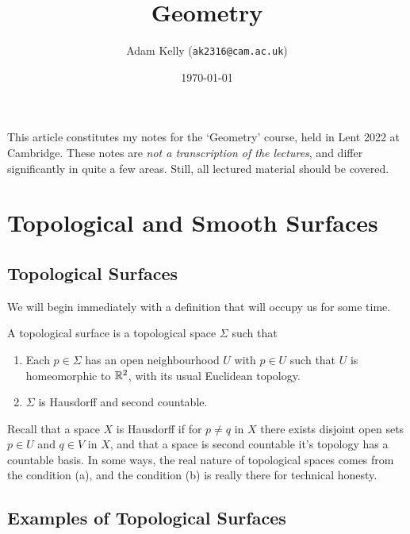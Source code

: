 \documentclass[a4paper]{scrartcl}
\title{Geometry}
\author{Adam Kelly (\texttt{ak2316@cam.ac.uk})}
\date{\today}
\begin{document}
\maketitle 


This article constitutes my notes for the `Geometry' course, held in Lent 2022 at Cambridge. These notes are \emph{not a transcription of the lectures}, and differ significantly in quite a few areas. Still, all lectured material should be covered.



\tableofcontents

\section{Topological and Smooth Surfaces}

\subsection{Topological Surfaces}

We will begin immediately with a definition that will occupy us for some time.

\begin{definition}
    A topological surface is a topological space $\Sigma$ such that
    \begin{enumerate}[label=(\roman*)]
        \item Each $p \in \Sigma$ has an open neighbourhood $U$ with $p \in U$ such that $U$ is homeomorphic to $\mathbb{R}^2$, with its usual Euclidean topology.
        \item $\Sigma$ is Hausdorff and second countable.
    \end{enumerate}    
\end{definition}

Recall that a space $X$ is Hausdorff if for $p \neq q$ in $X$ there exists disjoint open sets $p \in U$ and $q \in V$ in $X$, and that a space is second countable it's topology has a countable basis.
In some ways, the real nature of topological spaces comes from the condition (a), and the condition (b) is really there for technical honesty.

\subsection{Examples of Topological Surfaces}
\end{document}
